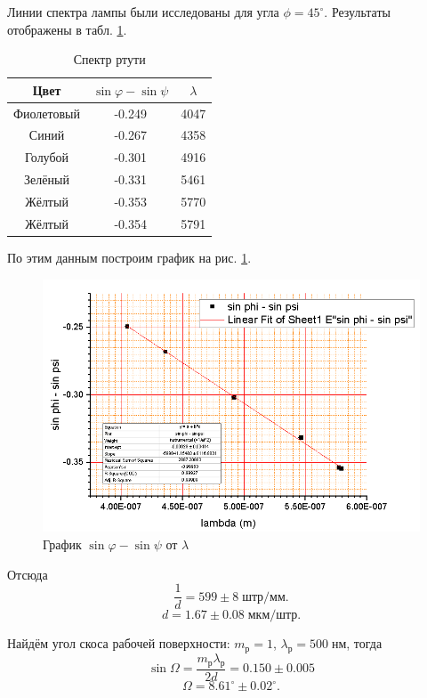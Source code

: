 \documentclass[a4paper]{article}
\begin{document}
Линии спектра лампы были исследованы для угла $ \phi = 45^\circ $. Результаты отображены в табл. \ref{tab:allspectre}.
\begin{table}[htb]
	\centering
\begin{tabular}{|c|c|c|}
	\hline
	Цвет       & $ \sin\varphi -\sin\psi $ & $ \lambda$ \\ \hline
	Фиолетовый & -0.249                  & 4047       \\ \hline
	Синий      & -0.267                   & 4358       \\ \hline
	Голубой    & -0.301                  & 4916       \\ \hline
	Зелёный    & -0.331                  & 5461       \\ \hline
	Жёлтый     & -0.353                  & 5770       \\ \hline
	Жёлтый     & -0.354                  & 5791       \\ \hline
\end{tabular}
\caption{Спектр ртути}
\label{tab:allspectre}
\end{table}

По этим данным построим график на рис. \ref{fig:screenshot1}.
\begin{figure}[tbp]
	\centering
	\includegraphics[width=0.8\linewidth]{Screenshot_1}
	\caption{График $\sin \varphi - \sin \psi$ от $\lambda$}
	\label{fig:screenshot1}
\end{figure}
Отсюда
\begin{equation*}\label{key}
	\frac{1}{d} = 599 \pm 8\; штр/мм.
\end{equation*}
\begin{equation*}\label{key}
	d = 1.67 \pm 0.08 \; мкм/штр.
\end{equation*}

Найдём угол скоса рабочей поверхности: $ m_р = 1 $, $ \lambda_р = 500 \; нм $, тогда
\begin{equation*}\label{key}
	\sin \Omega = \frac{m_р \lambda_р}{2 d} = 0.150\pm 0.005
\end{equation*}
\begin{equation*}\label{key}
	\Omega = 8.61^\circ \pm 0.02^\circ.
\end{equation*}
\end{document}
